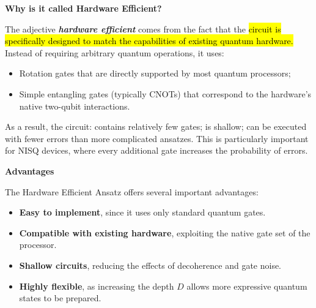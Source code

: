 \begin{flushleft}
    \textcolor{Green3}{ \textbf{Why is it called Hardware Efficient?}}
\end{flushleft}
The adjective \textbf{\emph{hardware efficient}} comes from the fact that the \hl{circuit is specifically designed to match the capabilities of existing quantum hardware.} Instead of requiring arbitrary quantum operations, it uses:
\begin{itemize}
    \item Rotation gates that are directly supported by most quantum processors;
    \item Simple entangling gates (typically CNOTs) that correspond to the hardware's native two-qubit interactions.
\end{itemize}
As a result, the circuit: contains relatively few gates; is shallow; can be executed with fewer errors than more complicated ansatzes. This is particularly important for NISQ devices, where every additional gate increases the probability of errors.

\highspace
\begin{flushleft}
    \textcolor{Green3}{ \textbf{Advantages}}
\end{flushleft}
The Hardware Efficient Ansatz offers several important advantages:
\begin{itemize}
    \item[\textcolor{Green3}{\faIcon{check}}] \textbf{Easy to implement}, since it uses only standard quantum gates.
    \item[\textcolor{Green3}{\faIcon{check}}] \textbf{Compatible with existing hardware}, exploiting the native gate set of the processor.
    \item[\textcolor{Green3}{\faIcon{check}}] \textbf{Shallow circuits}, reducing the effects of decoherence and gate noise.
    \item[\textcolor{Green3}{\faIcon{check}}] \textbf{Highly flexible}, as increasing the depth $D$ allows more expressive quantum states to be prepared.
\end{itemize}

